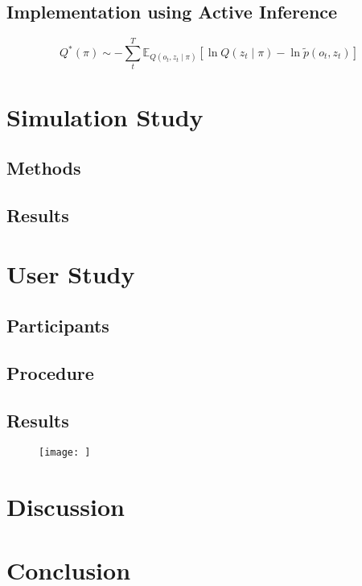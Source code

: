 \documentclass[manuscript,screen,review]{acmart}
\begin{document}
\subsection{Implementation using Active Inference}

\begin{equation}
Q^*(\pi) \sim - \sum_{t}^{T} \mathbb E_{Q(o_t, z_t \mid \pi)} \left[\ln Q(z_t \mid \pi) - \ln \tilde p(o_t, z_t) \right]
\end{equation}


\section{Simulation Study}

\subsection{Methods}

\subsection{Results}


\section{User Study}

\subsection{Participants}

\subsection{Procedure}

\subsection{Results}

\begin{figure}[h]
  \centering
  \texttt{[image: ]}
  \caption{}
  \Description{}
\end{figure}

\section{Discussion}

\section{Conclusion}
\end{document}
